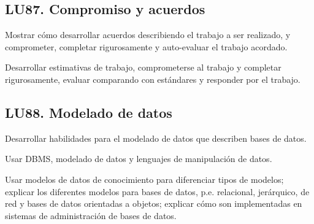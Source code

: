 \subsection{LU87. Compromiso y acuerdos}\label{sec:LU87}
\begin{LearningUnit}
\begin{LUGoal}
\item Mostrar cómo desarrollar acuerdos describiendo el trabajo a ser realizado, y comprometer, completar rigurosamente y auto-evaluar el trabajo acordado.
\end{LUGoal}

\begin{LUObjective}
\item Desarrollar estimativas de trabajo, comprometerse al trabajo y completar rigurosamente, evaluar comparando con estándares y responder por el trabajo.
\end{LUObjective}
\end{LearningUnit}

\subsection{LU88. Modelado de datos}\label{sec:LU88}
\begin{LearningUnit}
\begin{LUGoal}
\item Desarrollar habilidades para el modelado de datos que describen bases de datos.
\end{LUGoal}

\begin{LUObjective}
\item Usar DBMS, modelado de datos y lenguajes de manipulación de datos.
\item Usar modelos de datos de conocimiento para diferenciar tipos de modelos; explicar los diferentes modelos para bases de datos, p.e. relacional, jerárquico, de red y bases de datos orientadas a objetos; explicar cómo son implementadas en sistemas de administración de bases de datos.
\end{LUObjective}
\end{LearningUnit}

